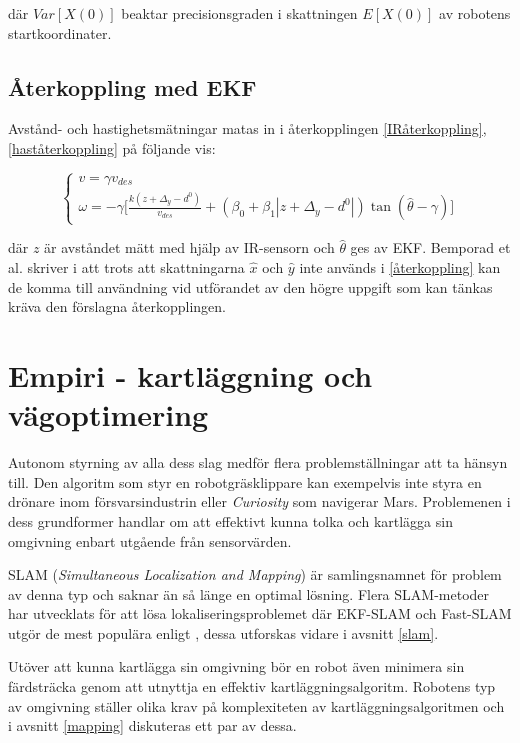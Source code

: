 \documentclass[11pt]{article}
\begin{document}
\begin{flushleft}
där $Var[X(0)]$ beaktar precisionsgraden i skattningen $E[X(0)]$ av robotens startkoordinater.

\subsection{Återkoppling med EKF}
Avstånd- och hastighetsmätningar matas in i återkopplingen \eqref{IRåterkoppling},  \eqref{haståterkoppling} på följande vis:

\begin{equation}\label{återkoppling}
	\begin{cases}
	v = \gamma v_{des} \\
	\omega = - \gamma \bigg[ \frac {k(z + \Delta_y - d^0)} {v_{des}} + (\beta_0 + \beta_1 | z + \Delta_y - d^0 |) \tan (\hat{\theta} - \gamma) \bigg]
	\end{cases}
\end{equation}

där $z$ är avståndet mätt med hjälp av IR-sensorn och $\hat{\theta}$ ges av EKF. Bemporad et al. skriver i \cite{wfp} att trots att skattningarna $\hat{x}$ och $\hat{y}$ inte används i \eqref{återkoppling} kan de komma till användning vid utförandet av den högre uppgift som kan tänkas kräva den förslagna återkopplingen.

\pagebreak
\section{Empiri - kartläggning och vägoptimering}
Autonom styrning av alla dess slag medför flera problemställningar att ta hänsyn till. Den algoritm som styr en robotgräsklippare kan exempelvis inte styra en drönare inom försvarsindustrin eller \emph{Curiosity} som navigerar Mars. Problemenen i dess grundformer handlar om att effektivt kunna tolka och kartlägga sin omgivning enbart utgående från sensorvärden.

SLAM (\emph{Simultaneous Localization and Mapping}) är samlingsnamnet för problem av denna typ och saknar än så länge en optimal lösning. Flera SLAM-metoder har utvecklats för att lösa lokaliseringsproblemet där EKF-SLAM och Fast-SLAM utgör de mest populära enligt \cite{rat}, dessa utforskas vidare i avsnitt \ref{slam}.

Utöver att kunna kartlägga sin omgivning bör en robot även minimera sin färdsträcka genom att utnyttja en effektiv kartläggningsalgoritm. Robotens typ av omgivning ställer olika krav på komplexiteten av kartläggningsalgoritmen och i avsnitt \ref{mapping} diskuteras ett par av dessa.


\end{flushleft}
\end{document}
